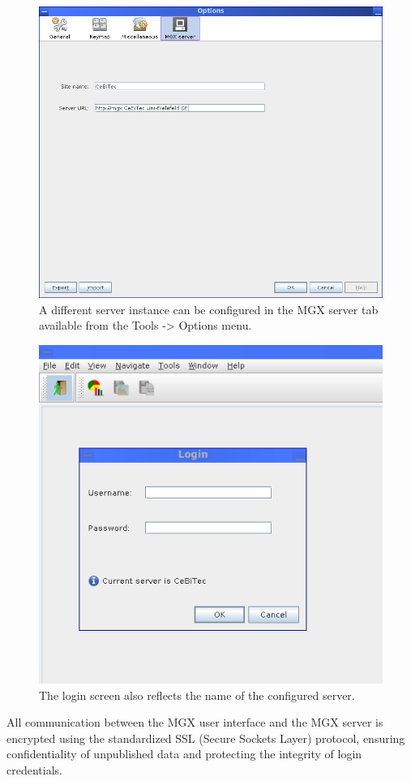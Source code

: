 \begin{figure}[ht]
\centering
\includegraphics[width=.8\textwidth]{img/configure-site}
\caption[Server configuration:]{A different server instance can be configured in the MGX 
server tab available from the Tools -> Options menu.}
\label{config-site}
\end{figure}


\begin{figure}[ht]
\centering
\includegraphics[width=.8\textwidth]{img/login-screen}
\caption[Login screen:]{The login screen also reflects the name of the configured server.}
\label{login-screen}
\end{figure}

All communication between the MGX user interface and the MGX server is encrypted using
the standardized SSL (Secure Sockets Layer) protocol, ensuring confidentiality of 
unpublished data and protecting the integrity of login credentials.

